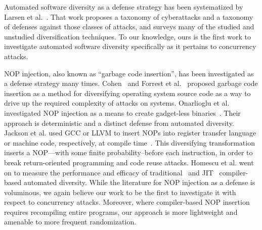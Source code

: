 Automated software diversity as a defense strategy has been systematized by Larsen et al.~\cite{Larsen2014}.
That work proposes a taxonomy of cyberattacks and a taxonomy of defenses against those classes of attacks, and surveys many of the studied and unstudied diversification techniques.
To our knowledge, ours is the first work to investigate automated software diversity specifically as it pertains to concurrency attacks.

NOP injection, also known as ``garbage code insertion'', has been investigated as a defense strategy many times.
Cohen~\cite{Cohen1993} and Forrest et al.~\cite{Forrest1997} proposed garbage code insertion as a method for diversifying operating system source code as a way to drive up the required complexity of attacks on systems.
Onarlioglu et al. investigated NOP injection as a means to create gadget-less binaries~\cite{Onarlioglu2010}.
Their approach is deterministic and a distinct defense from automated diversity.
Jackson et al. used GCC or LLVM to insert NOPs into register transfer language or machine code, respectively, at compile time~\cite{Jackson2013}.
This diversifying transformation inserts a NOP---with some finite probability--before each instruction, in order to break return-oriented programming and code reuse attacks.
Homescu et al. went on to measure the performance and efficacy of traditional~\cite{Homescu2013a} and JIT~\cite{Homescu2013} compiler-based automated diversity.
While the literature for NOP injection as a defense is voluminous, we again believe our work to be the first to investigate it with respect to concurrency attacks.
Moreover, where compiler-based NOP insertion requires recompiling entire programs, our approach is more lightweight and amenable to more frequent randomization.